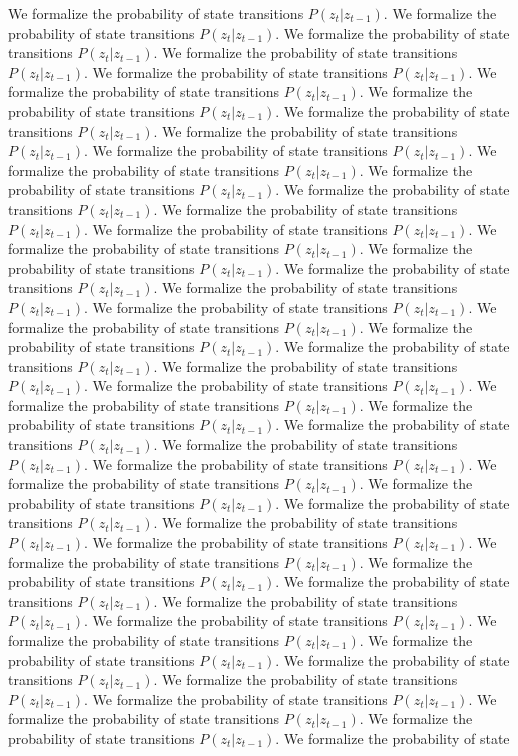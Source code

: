 We formalize the probability of state transitions $P(z_t | z_{t-1})$. We formalize the probability of state transitions $P(z_t | z_{t-1})$. We formalize the probability of state transitions $P(z_t | z_{t-1})$. We formalize the probability of state transitions $P(z_t | z_{t-1})$. We formalize the probability of state transitions $P(z_t | z_{t-1})$. We formalize the probability of state transitions $P(z_t | z_{t-1})$. We formalize the probability of state transitions $P(z_t | z_{t-1})$. We formalize the probability of state transitions $P(z_t | z_{t-1})$. We formalize the probability of state transitions $P(z_t | z_{t-1})$. We formalize the probability of state transitions $P(z_t | z_{t-1})$. We formalize the probability of state transitions $P(z_t | z_{t-1})$. We formalize the probability of state transitions $P(z_t | z_{t-1})$. We formalize the probability of state transitions $P(z_t | z_{t-1})$. We formalize the probability of state transitions $P(z_t | z_{t-1})$. We formalize the probability of state transitions $P(z_t | z_{t-1})$. We formalize the probability of state transitions $P(z_t | z_{t-1})$. We formalize the probability of state transitions $P(z_t | z_{t-1})$. We formalize the probability of state transitions $P(z_t | z_{t-1})$. We formalize the probability of state transitions $P(z_t | z_{t-1})$. We formalize the probability of state transitions $P(z_t | z_{t-1})$. We formalize the probability of state transitions $P(z_t | z_{t-1})$. We formalize the probability of state transitions $P(z_t | z_{t-1})$. We formalize the probability of state transitions $P(z_t | z_{t-1})$. We formalize the probability of state transitions $P(z_t | z_{t-1})$. We formalize the probability of state transitions $P(z_t | z_{t-1})$. We formalize the probability of state transitions $P(z_t | z_{t-1})$. We formalize the probability of state transitions $P(z_t | z_{t-1})$. We formalize the probability of state transitions $P(z_t | z_{t-1})$. We formalize the probability of state transitions $P(z_t | z_{t-1})$. We formalize the probability of state transitions $P(z_t | z_{t-1})$. We formalize the probability of state transitions $P(z_t | z_{t-1})$. We formalize the probability of state transitions $P(z_t | z_{t-1})$. We formalize the probability of state transitions $P(z_t | z_{t-1})$. We formalize the probability of state transitions $P(z_t | z_{t-1})$. We formalize the probability of state transitions $P(z_t | z_{t-1})$. We formalize the probability of state transitions $P(z_t | z_{t-1})$. We formalize the probability of state transitions $P(z_t | z_{t-1})$. We formalize the probability of state transitions $P(z_t | z_{t-1})$. We formalize the probability of state transitions $P(z_t | z_{t-1})$. We formalize the probability of state transitions $P(z_t | z_{t-1})$. We formalize the probability of state transitions $P(z_t | z_{t-1})$. We formalize the probability of state transitions $P(z_t | z_{t-1})$. We formalize the probability of state transitions $P(z_t | z_{t-1})$. We formalize the probability of state transitions $P(z_t | z_{t-1})$. We formalize the probability of state transitions $P(z_t | z_{t-1})$. We formalize the probability of state transitions $P(z_t | z_{t-1})$. We formalize the probability of state transitions $P(z_t | z_{t-1})$. We formalize the probability of state 